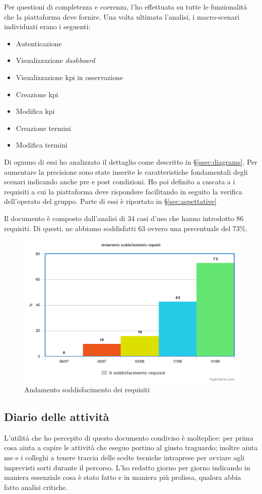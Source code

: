 Per questioni di completezza e coerenza, l'ho effettuata su tutte le funzionalità che la piattaforma deve fornire.
Una volta ultimata l'analisi, i macro-scenari individuati erano i seguenti:
\begin{itemize}
    \item Autenticazione
    \item Visualizzazione \textit{dashboard}
    \item Visualizzazione \acrshort{kpi} in osservazione
    \item Creazione \acrshort{kpi}
    \item Modifica \acrshort{kpi}
    \item Creazione termini
    \item Modifica termini
\end{itemize}

Di ognuno di essi ho analizzato il dettaglio come descritto in \S\ref{ssec:diagrams}.
Per aumentare la precisione sono state inserite le caratteristiche fondamentali degli scenari indicando anche pre e post condizioni.
Ho poi definito a cascata a i requisiti a cui la piattaforma deve rispondere facilitando in seguito la verifica dell'operato del gruppo. Parte di essi è riportato in \S\ref{sec:aspettative}

Il documento è composto dall'analisi di 34 casi d'uso che hanno introdotto 86 requisiti. Di questi, ne abbiamo soddisfatti 63 ovvero una percentuale del 73\%.
\vspace{50pt}
\begin{figure}[H]
    \centering
    \includegraphics[width=0.65\columnwidth]{immagini/chart.png}
    \caption{Andamento soddisfacimento dei requisiti}
    \label{fig:reqChart}
\end{figure}
\newpage
\subsection{Diario delle attività}
L'utilità che ho percepito di questo documento condiviso è molteplice: per prima cosa aiuta a capire le attività che eseguo portino al giusto traguardo; inoltre aiuta me e i colleghi a tenere traccia delle scelte tecniche intraprese per ovviare agli imprevisti sorti durante il percorso. L'ho redatto giorno per giorno indicando in maniera essenziale cosa è stato fatto e in maniera più prolissa, qualora abbia fatto analisi critiche.

